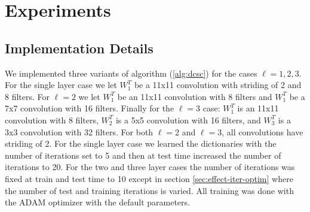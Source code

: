 \section{Experiments}

\subsection{Implementation Details}
\label{sec:impl-deta}

We implemented three variants of algorithm (\ref{alg:dcsc}) for the cases $\ell = 1,2,3$. For the single layer case we let $W^T_1$ be a 11x11 convolution with striding of 2 and 8 filters. For $\ell = 2$ we let $W^T_{1}$ be an 11x11 convolution with 8 filters and $W^T_{1}$ be a 7x7 convolution with 16 filters. Finally for the $\ell = 3$ case: $W^T_{1}$ is an 11x11 convolution with 8 filters, $W^T_{2}$ is a 5x5 convolution with 16 filters, and $W^T_{3}$ is a 3x3 convolution with 32 filters. For both $\ell = 2$ and $\ell = 3$, all convolutions have striding of 2. For the single layer case we learned the dictionaries with the number of iterations set to 5 and then at test time increased the number of iterations to 20. For the two and three layer cases the number of iterations was fixed at train and test time to 10 except in section \ref{sec:effect-iter-optim} where the number of test and training iterations is varied. All training was done with the ADAM optimizer with the default parameters.
